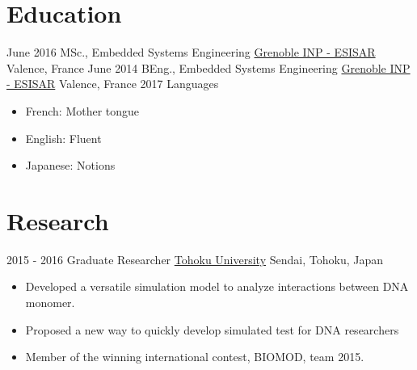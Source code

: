 \documentclass[a4paper]{template} %
\begin{document}
\makeprofile %

\section{Education}

\begin{twenty} %
	\twentyitem
    	{June 2016}
        {MSc., Embedded Systems Engineering}
        {\href{http://esisar.grenoble-inp.fr/}{Grenoble INP - ESISAR}}
        {Valence, France}
	\twentyitem
    	{June 2014}
        {BEng., Embedded Systems Engineering}
        {\href{http://esisar.grenoble-inp.fr/}{Grenoble INP - ESISAR}}
        {Valence, France}
	\twentyitem
	    	{2017}
	        {Languages}
	        {}
	        {}
	        {
	        {\begin{itemize}
							\item French: Mother tongue
							\item English: Fluent
							\item Japanese: Notions
			    \end{itemize}}
	        }
\end{twenty}


\section{Research}
\begin{twenty}
	\twentyitem
    	{2015 - 2016}
        {Graduate Researcher}
        {\href{http://www.tohoku.ac.jp/en/}{Tohoku University}}
        {Sendai, Tohoku, Japan}
        {
        {\begin{itemize}
        \item Developed a versatile simulation model to analyze interactions between DNA monomer.
        \item Proposed a new way to quickly develop simulated test for DNA researchers
        \item Member of the winning international contest, BIOMOD, team 2015.
    \end{itemize}}
        }
\end{twenty}

\end{document}
